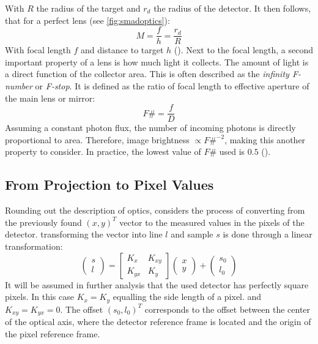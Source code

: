 With $R$ the radius of the target and $r_d$ the radius of the detector. It then follows, that for a perfect lens (see \autoref{fig:smadoptics}):
\begin{equation}
    M = \frac{f}{h} = \frac{r_d}{R}
\end{equation}
With focal length $f$ and distance to target $h$ (\cite{SMAD}). Next to the focal length, a second important property of a lens is how much light it collects. The amount of light is a direct function of the collector area. This is often described as the \textit{infinity F-number} or \textit{F-stop}. It is defined as the ratio of focal length to effective aperture of the main lens or mirror:
\begin{equation}
    F\# = \frac{f}{D}
\end{equation}
Assuming a constant photon flux, the number of incoming photons is directly proportional to area. Therefore, image brightness $\propto F\#^{-2}$, making this another property to consider. In practice, the lowest value of $F\#$ used is $0.5$ (\cite{SMAD}).
\subsection{From Projection to Pixel Values}
Rounding out the description of optics, \cite{OpNav} considers the process of converting from the previously found $(x, y)^T$ vector to the measured values in the pixels of the detector. transforming the vector into line $l$ and sample $s$ is done through a linear transformation:
\begin{equation}
    \begin{pmatrix}s \\ l\end{pmatrix} = \begin{bmatrix}K_x & K_{xy} \\ K_{yx} & K_y\end{bmatrix} \begin{pmatrix}x \\ y \end{pmatrix} + \begin{pmatrix} s_0 \\ l_0 \end{pmatrix}
\end{equation}
It will be assumed in further analysis that the used detector has perfectly square pixels. In this case $K_x = K_y$ equalling the side length of a pixel. and $K_{xy} = K_{yx} = 0$. The offset $(s_0, l_0)^T$ corresponds to the offset between the center of the optical axis, where the detector reference frame is located and the origin of the pixel reference frame.\\

